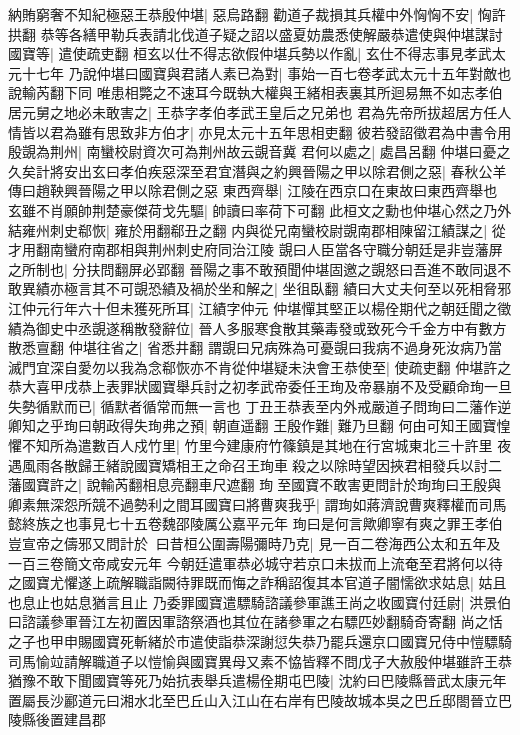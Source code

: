 納賄窮奢不知紀極惡王恭殷仲堪|{
	惡烏路翻}
勸道子裁損其兵權中外恟恟不安|{
	恟許拱翻}
恭等各繕甲勒兵表請北伐道子疑之詔以盛夏妨農悉使解嚴恭遣使與仲堪謀討國寶等|{
	遣使疏吏翻}
桓玄以仕不得志欲假仲堪兵勢以作亂|{
	玄仕不得志事見孝武太元十七年}
乃說仲堪曰國寶與君諸人素已為對|{
	事始一百七卷孝武太元十五年對敵也說輸芮翻下同}
唯患相斃之不速耳今既執大權與王緒相表裏其所迴易無不如志孝伯居元舅之地必未敢害之|{
	王恭字孝伯孝武王皇后之兄弟也}
君為先帝所拔超居方任人情皆以君為雖有思致非方伯才|{
	亦見太元十五年思相吏翻}
彼若發詔徵君為中書令用殷覬為荆州|{
	南蠻校尉資次可為荆州故云覬音冀}
君何以處之|{
	處昌呂翻}
仲堪曰憂之久矣計將安出玄曰孝伯疾惡深至君宜潛與之約興晉陽之甲以除君側之惡|{
	春秋公羊傳曰趙鞅興晉陽之甲以除君側之惡}
東西齊舉|{
	江陵在西京口在東故曰東西齊舉也}
玄雖不肖願帥荆楚豪傑荷戈先驅|{
	帥讀曰率荷下可翻}
此桓文之勳也仲堪心然之乃外結雍州刺史郗恢|{
	雍於用翻郗丑之翻}
内與從兄南蠻校尉覬南郡相陳留江績謀之|{
	從才用翻南蠻府南郡相與荆州刺史府同治江陵}
覬曰人臣當各守職分朝廷是非豈藩屏之所制也|{
	分扶問翻屏必郢翻}
晉陽之事不敢預聞仲堪固邀之覬怒曰吾進不敢同退不敢異績亦極言其不可覬恐績及禍於坐和解之|{
	坐徂臥翻}
績曰大丈夫何至以死相脅邪江仲元行年六十但未獲死所耳|{
	江績字仲元}
仲堪憚其堅正以楊佺期代之朝廷聞之徵績為御史中丞覬遂稱散發辭位|{
	晉人多服寒食散其藥毒發或致死今千金方中有數方散悉亶翻}
仲堪往省之|{
	省悉井翻}
謂覬曰兄病殊為可憂覬曰我病不過身死汝病乃當滅門宜深自愛勿以我為念郗恢亦不肯從仲堪疑未決會王恭使至|{
	使疏吏翻}
仲堪許之恭大喜甲戌恭上表罪狀國寶舉兵討之初孝武帝委任王珣及帝暴崩不及受顧命珣一旦失勢循默而已|{
	循默者循常而無一言也}
丁丑王恭表至内外戒嚴道子問珣曰二藩作逆卿知之乎珣曰朝政得失珣弗之預|{
	朝直遥翻}
王殷作難|{
	難乃旦翻}
何由可知王國寶惶懼不知所為遣數百人戍竹里|{
	竹里今建康府竹篠鎮是其地在行宮城東北三十許里}
夜遇風雨各散歸王緒說國寶矯相王之命召王珣車殺之以除時望因挾君相發兵以討二藩國寶許之|{
	說輸芮翻相息亮翻車尺遮翻}
珣至國寶不敢害更問計於珣珣曰王殷與卿素無深怨所競不過勢利之間耳國寶曰將曹爽我乎|{
	謂珣如蔣濟說曹爽釋權而司馬懿終族之也事見七十五卷魏邵陵厲公嘉平元年}
珣曰是何言歟卿寧有爽之罪王孝伯豈宣帝之儔邪又問計於曰昔桓公圍壽陽彌時乃克|{
	見一百二卷海西公太和五年及一百三卷簡文帝咸安元年}
今朝廷遣軍恭必城守若京口未拔而上流奄至君將何以待之國寶尤懼遂上疏解職詣闕待罪既而悔之詐稱詔復其本官道子闇懦欲求姑息|{
	姑且也息止也姑息猶言且止}
乃委罪國寶遣驃騎諮議參軍譙王尚之收國寶付廷尉|{
	洪景伯曰諮議參軍晉江左初置因軍諮祭酒也其位在諸參軍之右驃匹妙翻騎奇寄翻}
尚之恬之子也甲申賜國寶死斬緒於市遣使詣恭深謝愆失恭乃罷兵還京口國寶兄侍中愷驃騎司馬愉竝請解職道子以愷愉與國寶異母又素不恊皆釋不問戊子大赦殷仲堪雖許王恭猶豫不敢下聞國寶等死乃始抗表舉兵遣楊佺期屯巴陵|{
	沈約曰巴陵縣晉武太康元年置屬長沙酈道元曰湘水北至巴丘山入江山在右岸有巴陵故城本吳之巴丘邸閤晉立巴陵縣後置建昌郡}
